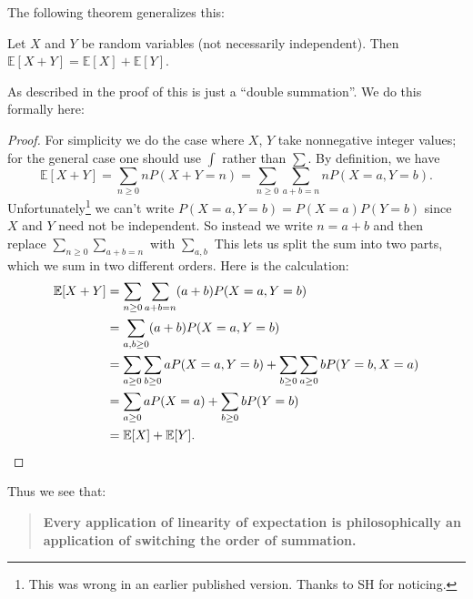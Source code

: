 \documentclass[11pt]{scrartcl}
\newcommand{\EE}{\mathbb E}
\begin{document}
The following theorem generalizes this:
\begin{example}
	Let $X$ and $Y$ be random variables
	(not necessarily independent).
	Then $\EE[X+Y] = \EE[X] + \EE[Y]$.
\end{example}
As described in \cite{ref:EV} the proof
of this is just a ``double summation''.
We do this formally here:
\begin{proof}
	For simplicity we do the case where $X$, $Y$ take
	nonnegative integer values; for the general case one should use $\int$
	rather than $\sum$.
	By definition, we have
	\[
		\EE[X+Y] = \sum_{n \ge 0} n P(X+Y=n)
		= \sum_{n \ge 0} \sum_{a+b=n} n P(X=a,Y=b).
	\]
	Unfortunately\footnote{%
		This was wrong in an earlier published version.
		Thanks to SH for noticing.}
	we can't write $P(X=a,Y=b) = P(X=a)P(Y=b)$ since
	$X$ and $Y$ need not be independent.
	So instead we write $n=a+b$ and then replace
	$\sum_{n \ge 0} \sum_{a+b=n}$ with $\sum_{a,b}$
	This lets us split the sum into two parts,
	which we sum in two different orders.
	Here is the calculation:
	\begin{align*}
		\EE[X+Y] &= \sum_{n \ge 0} \sum_{a+b=n} (a+b)P(X=a,Y=b) \\
		&= \sum_{a,b \ge 0} (a+b) P(X=a, Y=b) \\
		&= \sum_{a \ge 0} \sum_{b \ge 0} a P(X=a, Y=b)
		+ \sum_{b \ge 0} \sum_{a \ge 0} b P(Y=b, X=a) \\
		&= \sum_{a \ge 0} a P(X=a) + \sum_{b \ge 0} b P(Y=b) \\
		&= \EE[X] + \EE[Y]. \qedhere
	\end{align*}
\end{proof}
Thus we see that:
\begin{quote}
	\bfseries Every application of linearity of expectation is philosophically an application of switching the order of summation.
\end{quote}
\end{document}
